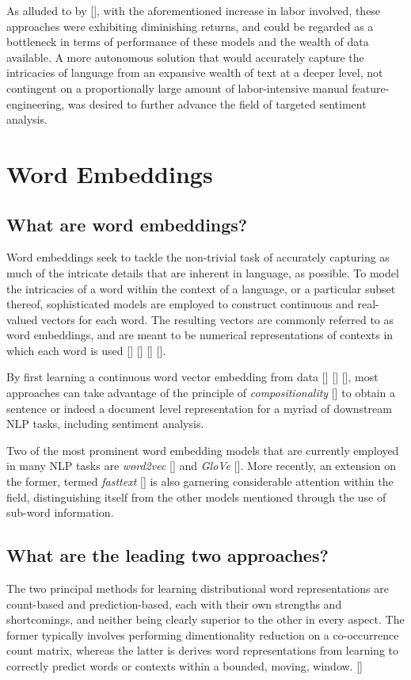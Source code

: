 \documentclass[12pt, a4paper]{report}
\theoremstyle{definition}
\theoremstyle{definition}%
\theoremstyle{definition}%
\theoremstyle{definition}%
\theoremstyle{definition}%
\theoremstyle{definition}%
\renewcommand{\cite}[1]{[\citealp{#1}]}
\begin{document}
As alluded to by \cite{zheng2018}, with the aforementioned increase in labor involved, these approaches were exhibiting diminishing returns, and could be regarded as a bottleneck in terms of performance of these models and the wealth of data available. A more autonomous solution that would accurately capture the intricacies of language from an expansive wealth of text at a deeper level, not contingent on a proportionally large amount of labor-intensive manual feature-engineering, was desired to further advance the field of targeted sentiment analysis.  

\section{Word Embeddings}
\subsection{What are word embeddings?}
Word embeddings seek to tackle the non-trivial task of accurately capturing as much of the intricate details that are inherent in language, as possible. To model the intricacies of a word within the context of a language, or a particular subset thereof, sophisticated models are employed to construct continuous and real-valued vectors for each word. The resulting vectors are commonly referred to as word embeddings, and are meant to be numerical representations of contexts in which each word is used  \cite{bengio2003} \cite{mikolov2013} \cite{pennington} \cite{tang}. 

By first learning a continuous word vector embedding from data \cite{bengio2003} \cite{mikolov2013} \cite{pennington}, most approaches can take advantage of the principle of \textit{compositionality} \cite{frege1892} to obtain a sentence or indeed a document level representation for a myriad of downstream NLP tasks, including sentiment analysis. 

Two of the most prominent word embedding models that are currently employed in many NLP tasks are \textit{word2vec} \cite{mikolov2013} and \textit{GloVe} \cite{pennington}. More recently, an extension on the former, termed \textit{fasttext} \cite{bojanowski2017} is also garnering considerable attention within the field, distinguishing itself from the other models mentioned through the use of sub-word information. 

\subsection{What are the leading two approaches?}
The two principal methods for learning distributional word representations are count-based and prediction-based, each with their own strengths and shortcomings, and neither being clearly superior to the other in every aspect. The former typically involves performing dimentionality reduction on a co-occurrence count matrix, whereas the latter is derives word representations from learning to correctly predict words or contexts within a bounded, moving, window. \cite{pennington}
\end{document}
